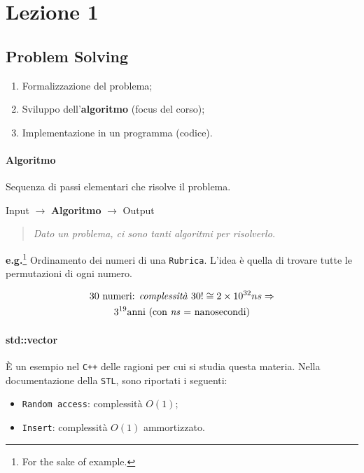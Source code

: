 \section{Lezione 1}

\subsection{Problem Solving}
\begin{enumerate}
	\item Formalizzazione del problema;
	\item Sviluppo dell'\textbf{algoritmo} (focus del corso);
	\item Implementazione in un programma (codice).
\end{enumerate}

\paragraph{Algoritmo} Sequenza di passi elementari che risolve il problema.\par

\begin{center}
	Input $\rightarrow$ \textbf{Algoritmo} $\rightarrow$ Output
\end{center}

\begin{quote} 
	\textit{Dato un problema, ci sono tanti algoritmi per risolverlo.}
\end{quote}

\noindent \textbf{e.g.}\footnote{For the sake of example.} Ordinamento dei numeri di una \texttt{Rubrica}.
L'idea è quella di trovare tutte le permutazioni di ogni numero.\par
\begin{gather*}
	\text{30 numeri: \textit{complessità} } 30! \cong 2 \times 10^{32}ns \Rightarrow \\
	3^{19} \text{anni (con \textit{ns} = nanosecondi)}
\end{gather*}

\paragraph{std::vector} È un esempio nel \texttt{C++} delle ragioni per cui 
si studia questa materia. Nella documentazione della \texttt{STL}, 
sono riportati i seguenti:

\begin{itemize}
	\item \texttt{Random access}: complessità $O(1)$;
	\item \texttt{Insert}: complessità $O(1)$ ammortizzato.
\end{itemize}

